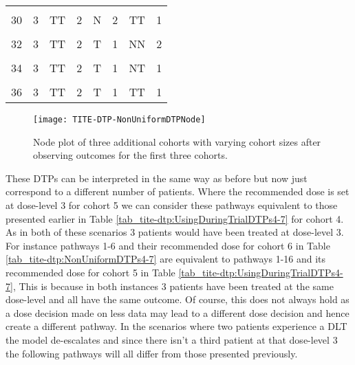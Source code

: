 \begin{table}[H]
{\begin{tabular}[t]{cccccccc}
			\cellcolor{gray!6}{29} & \cellcolor{gray!6}{3} & \cellcolor{gray!6}{TT} & \cellcolor{gray!6}{2} & \cellcolor{gray!6}{N} & \cellcolor{gray!6}{2} & \cellcolor{gray!6}{TT} & \cellcolor{gray!6}{1}\\
			30 & 3 & TT & 2 & N & 2 & TT & 1\\
			\cellcolor{gray!6}{31} & \cellcolor{gray!6}{3} & \cellcolor{gray!6}{TT} & \cellcolor{gray!6}{2} & \cellcolor{gray!6}{T} & \cellcolor{gray!6}{1} & \cellcolor{gray!6}{NN} & \cellcolor{gray!6}{2}\\
			32 & 3 & TT & 2 & T & 1 & NN & 2\\
			\cellcolor{gray!6}{33} & \cellcolor{gray!6}{3} & \cellcolor{gray!6}{TT} & \cellcolor{gray!6}{2} & \cellcolor{gray!6}{T} & \cellcolor{gray!6}{1} & \cellcolor{gray!6}{NT} & \cellcolor{gray!6}{1}\\
			34 & 3 & TT & 2 & T & 1 & NT & 1\\
			\cellcolor{gray!6}{35} & \cellcolor{gray!6}{3} & \cellcolor{gray!6}{TT} & \cellcolor{gray!6}{2} & \cellcolor{gray!6}{T} & \cellcolor{gray!6}{1} & \cellcolor{gray!6}{TT} & \cellcolor{gray!6}{1}\\
			36 & 3 & TT & 2 & T & 1 & TT & 1\\
			\bottomrule
	\end{tabular}}
\end{table}

\begin{figure}[h!]
	\centering
	\caption[DTP node plot for three additional various sized cohorts.]{Node plot of three additional cohorts with varying cohort sizes after observing outcomes for the first three cohorts.}
	\label{fig_tite-dtp:NonUniformDTPNode4-7}
	\texttt{[image: TITE-DTP-NonUniformDTPNode]}
\end{figure}

These DTPs can be interpreted in the same way as before but now just correspond to a different number of patients. Where the recommended dose is set at dose-level 3 for cohort 5 we can consider these pathways equivalent to those presented earlier in Table \ref{tab_tite-dtp:UsingDuringTrialDTPs4-7} for cohort 4. As in both of these scenarios 3 patients would have been treated at dose-level 3. For instance pathways 1-6 and their recommended dose for cohort 6 in Table \ref{tab_tite-dtp:NonUniformDTPs4-7} are equivalent to pathways 1-16 and its recommended dose for cohort 5 in Table \ref{tab_tite-dtp:UsingDuringTrialDTPs4-7}, This is because in both instances 3 patients have been treated at the same dose-level and all have the same outcome. Of course, this does not always hold as a dose decision made on less data may lead to a different dose decision and hence create a different pathway. In the scenarios where two patients experience a DLT the model de-escalates and since there isn't a third patient at that dose-level 3 the following pathways will all differ from those presented previously. 

